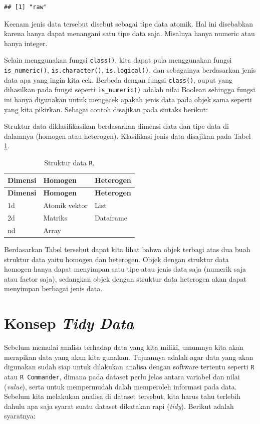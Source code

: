 \documentclass[12pt,]{krantz}
\begin{document}
\begin{verbatim}
## [1] "raw"
\end{verbatim}

Keenam jenis data tersebut disebut sebagai tipe data atomik. Hal ini disebabkan karena hanya dapat menangani satu tipe data saja. Misalnya hanya numeric atau hanya integer.

Selain menggunakan fungsi \texttt{class()}, kita dapat pula menggunakan fungsi \texttt{is\_numeric()}, \texttt{is.character()}, \texttt{is.logical()}, dan sebagainya berdasarkan jenis data apa yang ingin kita cek. Berbeda dengan fungsi \texttt{class()}, ouput yang dihasilkan pada fungsi seperti \texttt{is\_numeric()} adalah nilai Boolean sehingga fungsi ini hanya digunakan untuk mengecek apakah jenis data pada objek sama seperti yang kita pikirkan. Sebagai contoh disajikan pada sintaks berikut:

Struktur data diklasifikasikan berdasarkan dimensi data dan tipe data di dalamnya (homogen atau heterogen). Klasifikasi jenis data disajikan pada Tabel \ref{tab:strukturdata}.

\begin{longtable}[]{@{}lll@{}}
\caption{\label{tab:strukturdata} Struktur data \texttt{R}.}\tabularnewline
\toprule
\textbf{Dimensi} & \textbf{Homogen} & \textbf{Heterogen}\tabularnewline
\midrule
\endfirsthead
\toprule
\textbf{Dimensi} & \textbf{Homogen} & \textbf{Heterogen}\tabularnewline
\midrule
\endhead
1d & Atomik vektor & List\tabularnewline
2d & Matriks & Dataframe\tabularnewline
nd & Array &\tabularnewline
\bottomrule
\end{longtable}

Berdasarkan Tabel tersebut dapat kita lihat bahwa objek terbagi atas dua buah struktur data yaitu homogen dan heterogen. Objek dengan struktur data homogen hanya dapat menyimpan satu tipe atau jenis data saja (numerik saja atau factor saja), sedangkan objek dengan struktur data heterogen akan dapat menyimpan berbagai jenis data.

\hypertarget{tidydata}{%
\section{\texorpdfstring{Konsep \emph{Tidy Data}}{Konsep Tidy Data}}\label{tidydata}}

Sebelum memulai analisa terhadap data yang kita miliki, umumnya kita akan merapikan data yang akan kita gunakan. Tujuannya adalah agar data yang akan digunakan sudah siap untuk dilakukan analisa dengan software tertentu seperti \texttt{R} atau \texttt{R\ Commander}, dimana pada dataset perlu jelas antara variabel dan nilai (\emph{value}), serta untuk mempermudah dalah memperoleh informasi pada data. Sebelum kita melakukan analisa di dataset tersebut, kita harus tahu terlebih dahulu apa saja syarat suatu dataset dikatakan rapi (\emph{tidy}). Berikut adalah syaratnya:
\end{document}
